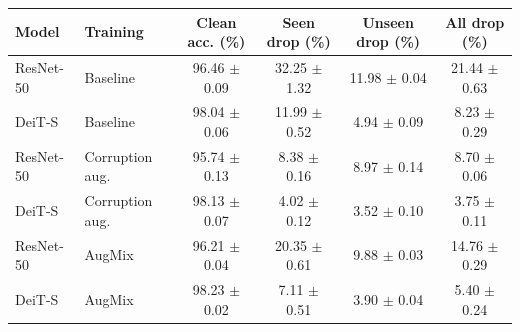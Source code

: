 \begin{tabular}{llcccc}
\toprule
Model & Training & Clean acc. (\%) & Seen drop (\%) & Unseen drop (\%) & All drop (\%) \\
\midrule
ResNet-50 & Baseline & 96.46 $\pm$ 0.09 & 32.25 $\pm$ 1.32 & 11.98 $\pm$ 0.04 & 21.44 $\pm$ 0.63 \\
DeiT-S & Baseline & 98.04 $\pm$ 0.06 & 11.99 $\pm$ 0.52 & 4.94 $\pm$ 0.09 & 8.23 $\pm$ 0.29 \\
ResNet-50 & Corruption aug. & 95.74 $\pm$ 0.13 & 8.38 $\pm$ 0.16 & 8.97 $\pm$ 0.14 & 8.70 $\pm$ 0.06 \\
DeiT-S & Corruption aug. & 98.13 $\pm$ 0.07 & 4.02 $\pm$ 0.12 & 3.52 $\pm$ 0.10 & 3.75 $\pm$ 0.11 \\
ResNet-50 & AugMix & 96.21 $\pm$ 0.04 & 20.35 $\pm$ 0.61 & 9.88 $\pm$ 0.03 & 14.76 $\pm$ 0.29 \\
DeiT-S & AugMix & 98.23 $\pm$ 0.02 & 7.11 $\pm$ 0.51 & 3.90 $\pm$ 0.04 & 5.40 $\pm$ 0.24 \\
\bottomrule
\end{tabular}
